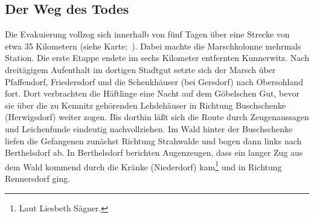 \subsection{Der Weg des Todes}

Die Evakuierung vollzog sich innerhalb von fünf Tagen über eine Strecke von etwa 35 Kilometern (siehe Karte:~). Dabei machte die Marschkolonne mehrmals Station. Die erste Etappe endete im sechs Kilometer entfernten Kunnerwitz. Nach dreitägigem Aufenthalt im dortigen Stadtgut setzte sich der Marsch über Pfaffendorf, Friedersdorf und die Schenkhäuser (bei Gersdorf) nach Obersohland fort. Dort verbrachten die Häftlinge eine Nacht auf dem Göbelschen Gut, bevor sie über die zu Kemnitz gehörenden Lehdehäuser in Richtung Buschschenke (Herwigsdorf) weiter zogen. Bis dorthin läßt sich die Route durch Zeugenaussagen und Leichenfunde eindeutig nachvollziehen. Im Wald hinter der Buschschenke liefen die Gefangenen zunächst Richtung Strahwalde und bogen dann links nach Berthelsdorf ab. 
In Berthelsdorf berichten Augenzeugen, dass ein langer Zug aus dem Wald kommend durch die Kränke (Niederdorf) kam\footnote{Laut Liesbeth Sägner.} und in Richtung Rennersdorf ging.

